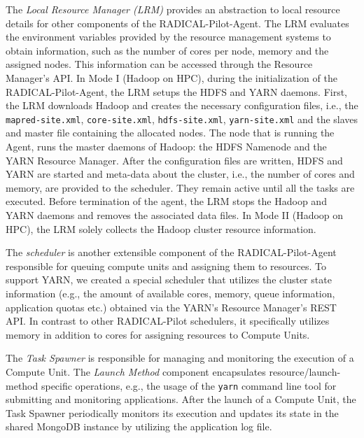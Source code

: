 The \emph{Local Resource Manager (LRM)} provides an abstraction to local resource details for other components of the RADICAL-Pilot-Agent.
The LRM evaluates the environment variables provided by the resource management systems to obtain information, such as the number of cores per node, memory and the assigned nodes.
This information can be accessed through the Resource Manager's API.
In Mode I (Hadoop on HPC), during the initialization of the RADICAL-Pilot-Agent, the LRM setups the HDFS and YARN daemons.
First, the LRM downloads Hadoop and creates the necessary configuration files, i.e., the \texttt{mapred-site.xml}, \texttt{core-site.xml}, \texttt{hdfs-site.xml}, \texttt{yarn-site.xml} and the slaves and master file containing the allocated nodes.
The node that is running the Agent, runs the master daemons of Hadoop: the HDFS Namenode and the YARN Resource Manager.
After the configuration files are written, HDFS and YARN are started and meta-data about the cluster, i.e., the number of cores and memory, are provided to the scheduler.
They remain active until all the tasks are executed.
Before termination of the agent, the LRM stops the Hadoop and YARN daemons and removes the associated data files.
In Mode II (Hadoop on HPC), the LRM solely collects the Hadoop cluster resource information.

The \emph{scheduler} is another extensible component of the RADICAL-Pilot-Agent responsible for queuing compute units and assigning them to resources.
To support YARN, we created a special scheduler that utilizes the cluster state information (e.g., the amount of available cores, memory, queue information, application quotas etc.) obtained via the YARN's Resource Manager's REST API.
In contrast to other RADICAL-Pilot schedulers, it specifically utilizes memory in addition to cores for assigning resources to Compute Units.

The \emph{Task Spawner} is responsible for managing and monitoring the execution of a Compute Unit.
The \emph{Launch Method} component encapsulates resource/launch-method specific operations, e.g., the usage of the \texttt{yarn} command line tool for submitting and monitoring applications.
After the launch of a Compute Unit, the Task Spawner periodically monitors its execution and updates its state in the shared MongoDB instance by utilizing the application log file.


